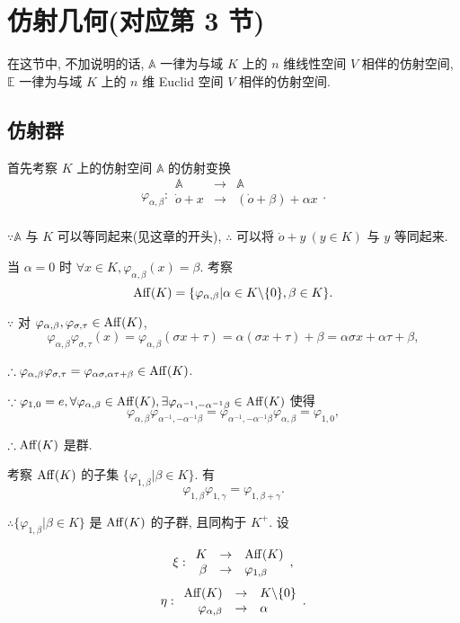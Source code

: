 \documentclass[color=black,device=normal,lang=cn,mode=geye]{elegantnote}
\begin{document}
\section{仿射几何(对应第 3 节)}
在这节中, 不加说明的话, $\mathbb{A}$ 一律为与域 $K$ 上的 $n$ 维线性空间 $V$ 相伴的仿射空间, $\mathbb{E}$ 一律为与域 $K$ 上的 $n$ 维 Euclid 空间 $V$ 相伴的仿射空间.
\subsection{仿射群}
首先考察 $K$ 上的仿射空间 $\mathbb{A}$ 的仿射变换
\[\varphi_{\alpha,\beta}:\begin{array}{rcl}
    \mathbb{A} & \to & \mathbb{A} \\
    \dot{o}+x & \to & (\dot{o}+\beta)+\alpha x \\
\end{array}.\]

$\because\mathbb{A}$ 与 $K$ 可以等同起来(见这章的开头), $\therefore$ 可以将 $\dot{o}+y\ (y\in K)$ 与 $y$ 等同起来.

当 $\alpha=0$ 时 $\forall x\in K,\varphi_{\alpha,\beta}(x)=\beta$. 考察
\[\operatorname{Aff} (K)=\{\varphi_{\alpha,\beta}|\alpha\in K\backslash\{0\},\beta\in K\}.\]

$\because$ 对 $\varphi_{\alpha,\beta},\varphi_{\sigma,\tau}\in\operatorname{Aff} (K)$,
\[\varphi_{\alpha,\beta}\varphi_{\sigma,\tau}(x)=\varphi_{\alpha,\beta}(\sigma x+\tau)=\alpha(\sigma x+\tau)+\beta=\alpha\sigma x+\alpha\tau+\beta,\]

$\therefore\varphi_{\alpha,\beta}\varphi_{\sigma,\tau}=\varphi_{\alpha\sigma,\alpha\tau+\beta}\in\operatorname{Aff} (K)$.

$\because\varphi_{1,0}=e,\forall\varphi_{\alpha,\beta}\in\operatorname{Aff} (K),\exists\varphi_{\alpha^{-1},-\alpha^{-1}\beta}\in\operatorname{Aff} (K)$ 使得
\[\varphi_{\alpha,\beta}\varphi_{\alpha^{-1},-\alpha^{-1}\beta}=\varphi_{\alpha^{-1},-\alpha^{-1}\beta}\varphi_{\alpha,\beta}=\varphi_{1,0},\]

$\therefore\operatorname{Aff}(K)$ 是群.

考察 $\operatorname{Aff} (K)$ 的子集 $\{\varphi_{1,\beta}|\beta\in K\}$. 有
\[\varphi_{1,\beta}\varphi_{1,\gamma}=\varphi_{1,\beta+\gamma}.\]

$\therefore\{\varphi_{1,\beta}|\beta\in K\}$ 是 $\operatorname{Aff} (K)$ 的子群, 且同构于 $K^+$. 设

\[\xi:\begin{array}{rcl}
    K & \to & \operatorname{Aff} (K) \\
    \beta & \to & \varphi_{1,\beta} \\
\end{array},\]
\[\eta:\begin{array}{rcl}
    \operatorname{Aff} (K) & \to & K\backslash\{0\} \\
    \varphi_{\alpha,\beta} & \to & \alpha \\
\end{array}.\]
\end{document}
